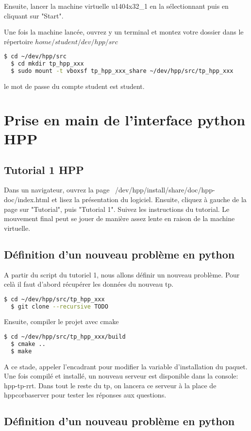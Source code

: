 \documentclass {article}
\begin{document}
Ensuite, lancer la machine virtuelle u1404x32\_1 en la s\'electionnant puis en cliquant sur "Start".

Une fois la machine lanc\'ee, ouvrez y un terminal et montez votre dossier dans le r\'epertoire $home/student/dev/hpp/src$

\begin{lstlisting}[language=bash]
  $ cd ~/dev/hpp/src
  $ cd mkdir tp_hpp_xxx
  $ sudo mount -t vboxsf tp_hpp_xxx_share ~/dev/hpp/src/tp_hpp_xxx 
\end{lstlisting}
le mot de passe du compte student est student.

\section {Prise en main de l'interface python HPP}
\subsection{Tutorial 1 HPP}
Dans un navigateur, ouvrez la page ~/dev/hpp/install/share/doc/hpp-doc/index.html et lisez la pr\'esentation du logiciel.
Ensuite, cliquez \`a gauche de la page sur "Tutorial", puis "Tutorial 1".
Suivez les instructions du tutorial.
Le mouvement final peut se jouer de mani\`ere assez lente en raison de la machine virtuelle.

\subsection{D\'efinition d'un nouveau probl\`eme en python}
A partir du script du tutoriel 1, nous allons d\'efinir un nouveau probl\`eme.
Pour cel\`a il faut d'abord r\'ecup\'erer les donn\'ees du nouveau tp.
\begin{lstlisting}[language=bash]
  $ cd ~/dev/hpp/src/tp_hpp_xxx
  $ git clone --recursive TODO
\end{lstlisting}
Ensuite, compiler le projet avec cmake
\begin{lstlisting}[language=bash]
  $ cd ~/dev/hpp/src/tp_hpp_xxx/build
  $ cmake ..
  $ make
\end{lstlisting}

A ce stade, appeler l'encadrant pour modifier la variable d'installation
du paquet.
Une fois compil\'e et install\'e, un nouveau serveur est disponible dans la console:
hpp-tp-rrt. Dans tout le reste du tp, on lancera ce serveur \`a la place de hppcorbaserver
pour tester les r\'eponses aux questions.

\subsection{D\'efinition d'un nouveau probl\`eme en python}
\end{document}
